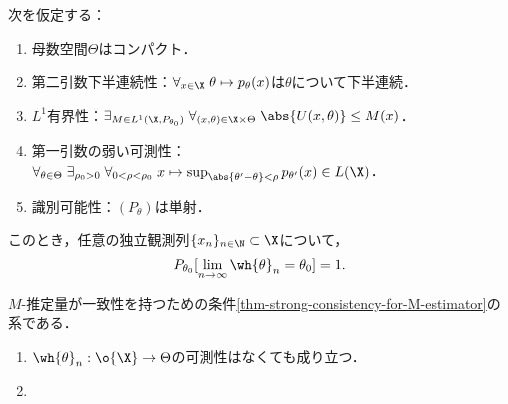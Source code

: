 \documentclass[uplatex,dvipdfmx]{jsreport}
\begin{document}
\begin{corollary}
    次を仮定する：
    \begin{enumerate}[({M}1)]
        \item 母数空間$\Theta$はコンパクト．
        \item 第二引数下半連続性：$\forall_{x\in\X}\;\theta\mapsto p_\theta(x)$は$\theta$について下半連続．
        \item $L^1$有界性：$\exists_{M\in L^1(\X,P_{\theta_0})}\;\forall_{(x,\theta)\in\X\times\Theta}\;\abs{U(x,\theta)}\le M(x)$．
        \item 第一引数の弱い可測性： $\forall_{\theta\in\Theta}\;\exists_{\rho_0>0}\;\forall_{0<\rho<\rho_0}\;x\mapsto\sup_{\abs{\theta'-\theta}<\rho}p_{\theta'}(x)\in L(\X)$．
        \item 識別可能性：$(P_\theta)$は単射．
    \end{enumerate}
    このとき，任意の独立観測列$\{x_n\}_{n\in\N}\subset\X$について，
    \[P_{\theta_0}[\lim_{n\to\infty}\wh{\theta}_n=\theta_0]=1.\]
\end{corollary}
\begin{Proof}
    $M$-推定量が一致性を持つための条件\ref{thm-strong-consistency-for-M-estimator}の系である．
\end{Proof}
\begin{remarks}\mbox{}
    \begin{enumerate}
        \item $\wh{\theta}_n:\o{\X}\to\Theta$の可測性はなくても成り立つ．
        \item 
    \end{enumerate}
\end{remarks}
\end{document}
